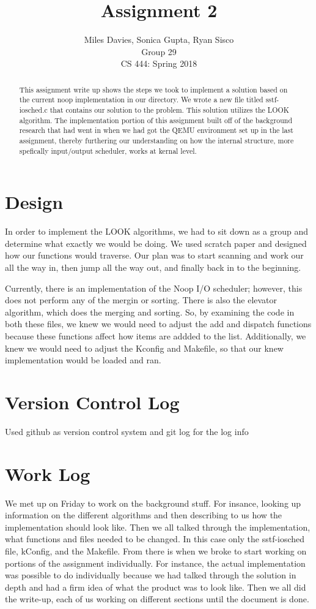 \documentclass[10pt, onecolumn, letterpaper, draftclsnofoot]{IEEEtran}
\title{Assignment 2}
\author{Miles Davies, Sonica Gupta, Ryan Sisco \\ Group 29 \\ CS 444: Spring 2018}
\begin{document}
\maketitle
\begin{abstract}
\noindent This assignment write up shows the steps we took to implement a solution based on the current noop implementation in our directory. We wrote a new file titled sstf-iosched.c that contains our solution to the problem. This solution utilizes the LOOK algorithm. The implementation portion of this assignment built off of the background research that had went in when we had got the QEMU environment set up in the last assignment, thereby furthering our understanding on how the internal structure, more spefically input/output scheduler, works at kernal level. 
\end{abstract}

\newpage

\tableofcontents
\newpage


\section{Design}
In order to implement the LOOK algorithms, we had to sit down as a group and determine what exactly we would be doing. We used scratch paper and designed how our functions would traverse. Our plan was to start scanning and work our all the way in, then jump all the way out, and finally back in to the beginning.

Currently, there is an implementation of the Noop I/O scheduler; however, this does not perform any of the mergin or sorting. There is also the elevator algorithm, which does the merging and sorting. So, by examining the code in both these files, we knew we would need to adjust the add and dispatch functions because these functions affect how items are addded to the list. Additionally, we knew we would need to adjust the Kconfig and Makefile, so that our knew implementation would be loaded and ran. 


\section{Version Control Log}
Used github as version control system and git log for the log info \par


\section{Work Log}
We met up on Friday to work on the background stuff. For insance, looking up information on the different algorithms and then describing to us how the implementation should look like. Then we all talked through the implementation, what functions and files needed to be changed. In this case only the sstf-iosched file, kConfig, and the Makefile. From there is when we broke to start working on portions of the assignment individually. For instance, the actual implementation was possible to do individually because we had talked through the solution in depth and had a firm idea of what the product was to look like. Then we all did the write-up, each of us working on different sections until the document is done. 
\end{document}
